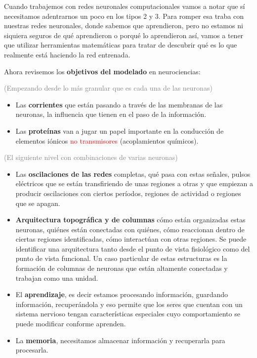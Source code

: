 Cuando trabajemos con redes neuronales computacionales vamos a notar que sí necesitamos adentrarnos un poco en los tipos 2 y 3. Para romper esa traba con nuestras redes neuronales, donde sabemos que aprendieron, pero no estamos ni siquiera seguros de qué aprendieron o porqué lo aprendieron así, vamos a tener que utilizar herramientas matemáticas para tratar de descubrir qué es lo que realmente está haciendo la red entrenada. 


Ahora revisemos los \textbf{objetivos del modelado} en neurociencias:

\textcolor{gray}{(Empezando desde lo más granular que es cada una de las neuronas)}

\begin{itemize}
 \item Las \textbf{corrientes} que están pasando a través de las membranas de las neuronas, la influencia que tienen en el paso de la información. 
 
 \item Las \textbf{proteínas} van a jugar un papel importante en la conducción de elementos iónicos \textcolor{red}{no transmisores} (acoplamientos químicos).
\end{itemize}

\textcolor{gray}{(El siguiente nivel con combinaciones de varias neuronas)}

\begin{itemize}
 \item Las \textbf{oscilaciones de las redes} completas, qué pasa con estas señales, pulsos eléctricos que se están transfiriendo de unas regiones a otras y que empiezan a producir oscilaciones con ciertos períodos,  regiones de actividad o regiones que se apagan.
 
 \item \textbf{Arquitectura topográfica y de columnas} cómo están organizadas estas neuronas, quiénes están conectadas con quiénes, cómo reaccionan dentro de ciertas regiones identificadas, cómo interactúan con otras regiones. Se puede identificar una arquitectura tanto desde el punto de vista fisiológico como del punto de vista funcional. Un caso particular de estas estructuras es la formación de columnas de neuronas que están altamente conectadas y trabajan como una unidad.
 
 \item El \textbf{aprendizaje}, es decir estamos procesando información, guardando información, recuperándola y eso permite que los seres que cuentan con un sistema nervioso tengan características especiales cuyo comportamiento se puede modificar conforme aprenden. 
 
 \item La \textbf{memoria}, necesitamos almacenar información y recuperarla para procesarla. 
\end{itemize}



